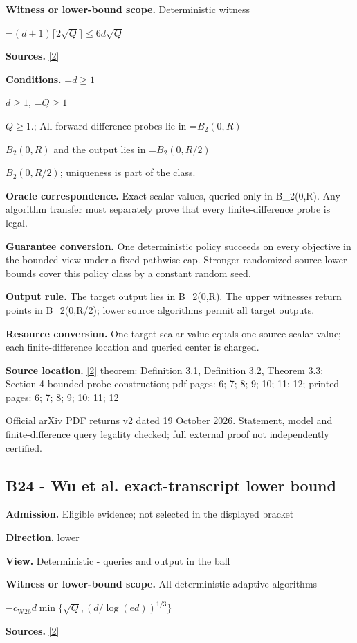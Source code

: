 \documentclass[10pt,a4paper]{article}
\newcommand{\AtlasMath}[1]{\par\begingroup\centering\setbox0=\hbox{$\displaystyle #1$}\ifdim\wd0>1.4\linewidth\typeout{ATLAS WIDE FORMULA: \the\wd0}\fi\ifdim\wd0>\linewidth\resizebox{\linewidth}{!}{\box0}\else\box0\fi\par\endgroup}
\newcommand{\AtlasInlineMath}[1]{\begingroup\setbox0=\hbox{$#1$}\ifdim\wd0>.4\linewidth\endgroup\AtlasMath{#1}\else\endgroup$#1$\fi}
\begin{document}
\textbf{Witness or lower-bound scope.} Deterministic witness

\AtlasMath{(d+1)\lceil2\sqrt Q\rceil\le6d\sqrt Q}
\textbf{Sources.} \href{https://arxiv.org/abs/2609.18230v2}{[2]}

\textbf{Conditions.} \AtlasInlineMath{d\ge1}, \AtlasInlineMath{Q\ge1}.; All forward-difference probes lie in \AtlasInlineMath{B_2(0,R)} and the output lies in \AtlasInlineMath{B_2(0,R/2)}; uniqueness is part of the class.

\textbf{Oracle correspondence.} Exact scalar values, queried only in B\_2(0,R). Any algorithm transfer must separately prove that every finite-difference probe is legal.

\textbf{Guarantee conversion.} One deterministic policy succeeds on every objective in the bounded view under a fixed pathwise cap. Stronger randomized source lower bounds cover this policy class by a constant random seed.

\textbf{Output rule.} The target output lies in B\_2(0,R). The upper witnesses return points in B\_2(0,R/2); lower source algorithms permit all target outputs.

\textbf{Resource conversion.} One target scalar value equals one source scalar value; each finite-difference location and queried center is charged.

\textbf{Source location.} \href{https://arxiv.org/abs/2609.18230v2}{[2]} theorem: Definition 3.1, Definition 3.2, Theorem 3.3; Section 4 bounded-probe construction; pdf pages: 6; 7; 8; 9; 10; 11; 12; printed pages: 6; 7; 8; 9; 10; 11; 12

Official arXiv PDF returns v2 dated 19 October 2026. Statement, model and finite-difference query legality checked; full external proof not independently certified.

\subsection{B24 - Wu et al. exact-transcript lower bound}
\textbf{Admission.} Eligible evidence; not selected in the displayed bracket

\textbf{Direction.} lower

\textbf{View.} Deterministic - queries and output in the ball

\textbf{Witness or lower-bound scope.} All deterministic adaptive algorithms

\AtlasMath{c_{\mathrm{W26}}d\min\{\sqrt Q,(d/\log(ed))^{1/3}\}}
\textbf{Sources.} \href{https://arxiv.org/abs/2609.18230v2}{[2]}
\end{document}
